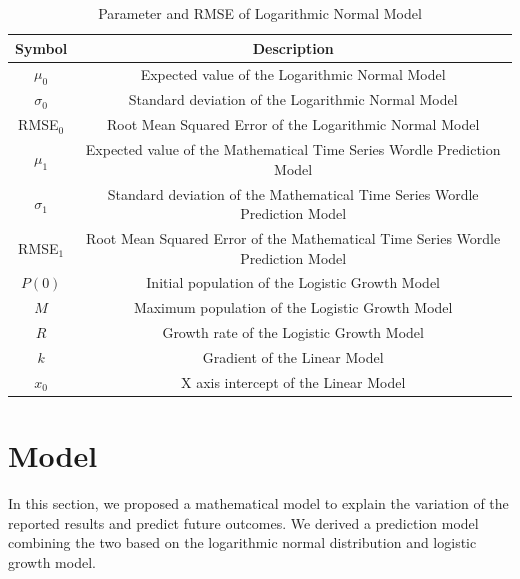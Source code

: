 \documentclass[12pt]{article}
\begin{document}
\begin{table}[h]
    \centering
    \begin{tabular}{cc}
    \hline
    \textbf{Symbol} & \textbf{Description}                                                            \\ \hline
    $\mu_0$         & Expected value of the Logarithmic Normal Model                                  \\
    $\sigma_0$      & Standard deviation of the Logarithmic Normal Model                              \\
    RMSE$_0$        & Root Mean Squared Error of the Logarithmic Normal Model                         \\
    $\mu_1$         & Expected value of the Mathematical Time Series Wordle Prediction Model          \\
    $\sigma_1$      & Standard deviation of the Mathematical Time Series Wordle Prediction Model      \\
    RMSE$_1$        & Root Mean Squared Error of the Mathematical Time Series Wordle Prediction Model \\
    $P(0)$          & Initial population of the Logistic Growth Model                                 \\
    $M$             & Maximum population of the Logistic Growth Model                                 \\
    $R$             & Growth rate of the Logistic Growth Model                                        \\
    $k$             & Gradient of the Linear Model                                                    \\
    $x_0$           & X axis intercept of the Linear Model                                            \\ \hline
    \end{tabular}
    \caption{Parameter and RMSE of Logarithmic Normal Model}
    \label{table0}
\end{table}

\section{Model \uppercase\expandafter{}}

In this section, we proposed a mathematical model to explain the variation of the reported results and predict future outcomes. We derived a prediction model combining the two based on the logarithmic normal distribution and logistic growth model.
\end{document}
